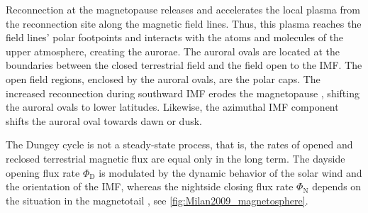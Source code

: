 Reconnection at the magnetopause releases and accelerates the local plasma from the reconnection site along the magnetic field lines. Thus, this plasma reaches the field lines' polar footpoints and interacts with the atoms and molecules of the upper atmosphere, creating the aurorae. The auroral ovals are located at the boundaries between the closed terrestrial field and the field open to the IMF. The open field regions, enclosed by the auroral ovals, are the polar caps. The increased reconnection during southward IMF erodes the magnetopause \citep{Aubry1970}, shifting the auroral ovals to lower latitudes. Likewise, the azimuthal IMF component shifts the auroral oval towards dawn or dusk.

The Dungey cycle is not a steady-state process, that is, the rates of opened and reclosed terrestrial magnetic flux are equal only in the long term. The dayside opening flux rate $\Phi_\text{D}$ is modulated by the dynamic behavior of the solar wind and the orientation of the IMF, whereas the nightside closing flux rate $\Phi_\text{N}$ depends on the situation in the magnetotail \citep{Milan2007}, see \autoref{fig:Milan2009_magnetosphere}.
\begin{figure}[htb]
\end{figure}
